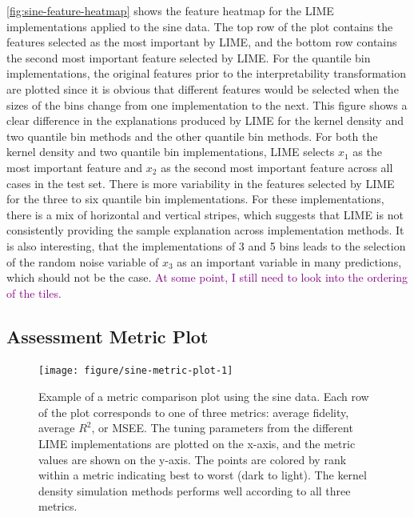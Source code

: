 \documentclass[AMS,STIX2COL]{WileyNJD-v2}\usepackage[]{graphicx}\usepackage[]{color}
\newenvironment{knitrout}{}{} %
\newcommand{\kgc}[1]{\textcolor{purple}{#1}}
\newcommand{\data}{sine data}
\begin{document}
{\autoref{fig:sine-feature-heatmap} shows the feature heatmap for the LIME implementations applied to the \data. The top row of the plot contains the features selected as the most important by LIME, and the bottom row contains the second most important feature selected by LIME. For the quantile bin implementations, the original features prior to the interpretability transformation are plotted  since it is obvious that different features would be selected when the sizes of the bins change from one implementation to the next. This figure shows a clear difference in the explanations produced by LIME for the kernel density and two quantile bin methods and the other quantile bin methods. For both the kernel density and two quantile bin implementations, LIME selects $x_1$ as the most important feature and $x_2$ as the second most important feature across all cases in the test set. There is more variability in the features selected by LIME for the three to six quantile bin implementations. For these implementations, there is a mix of horizontal and vertical stripes, which suggests that LIME is not consistently providing the sample explanation across implementation methods. It is also interesting, that the implementations of 3 and 5 bins leads to the selection of the random noise variable of $x_3$ as an important variable in many predictions, which should not be the case. \kgc{At some point, I still need to look into the ordering of the tiles.}

\subsection{Assessment Metric Plot}

\begin{figure}[!t]
\begin{knitrout}
\color{fgcolor}
\texttt{[image: figure/sine-metric-plot-1]} 

\end{knitrout}
\caption{Example of a metric comparison plot using the \data. Each row of the plot corresponds to one of three metrics: average fidelity, average $R^2$, or MSEE. The tuning parameters from the different LIME implementations are plotted on the x-axis, and the metric values are shown on the y-axis. The points are colored by rank within a metric indicating best to worst (dark to light). The kernel density simulation methods performs well according to all three metrics.}
\label{fig:sine-metric-plot}
\end{figure}

}
\end{document}
